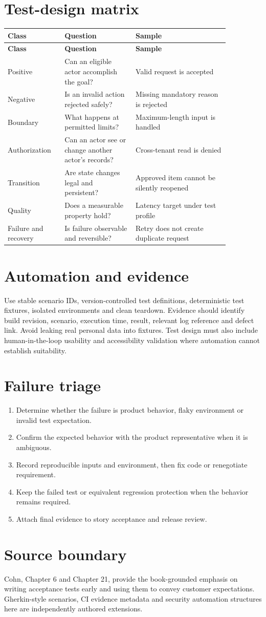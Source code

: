 \documentclass[11pt,letterpaper]{article}
\begin{document}
\section{Test-design matrix}
\begin{longtable}{|p{0.20\linewidth}|p{0.29\linewidth}|p{0.37\linewidth}|}\hline
\textbf{Class} & \textbf{Question} & \textbf{Sample} \\ \hline\endfirsthead\hline
\textbf{Class} & \textbf{Question} & \textbf{Sample} \\ \hline\endhead
Positive & Can an eligible actor accomplish the goal? & Valid request is accepted \\ \hline
Negative & Is an invalid action rejected safely? & Missing mandatory reason is rejected \\ \hline
Boundary & What happens at permitted limits? & Maximum-length input is handled \\ \hline
Authorization & Can an actor see or change another actor’s records? & Cross-tenant read is denied \\ \hline
Transition & Are state changes legal and persistent? & Approved item cannot be silently reopened \\ \hline
Quality & Does a measurable property hold? & Latency target under test profile \\ \hline
Failure and recovery & Is failure observable and reversible? & Retry does not create duplicate request \\ \hline
\end{longtable}
\section{Automation and evidence}
Use stable scenario IDs, version-controlled test definitions, deterministic test fixtures, isolated environments and clean teardown. Evidence should identify build revision, scenario, execution time, result, relevant log reference and defect link. Avoid leaking real personal data into fixtures. Test design must also include human-in-the-loop usability and accessibility validation where automation cannot establish suitability.

\section{Failure triage}
\begin{enumerate}[leftmargin=*,itemsep=3pt]
\item Determine whether the failure is product behavior, flaky environment or invalid test expectation.
\item Confirm the expected behavior with the product representative when it is ambiguous.
\item Record reproducible inputs and environment, then fix code or renegotiate requirement.
\item Keep the failed test or equivalent regression protection when the behavior remains required.
\item Attach final evidence to story acceptance and release review.
\end{enumerate}
\section{Source boundary}
Cohn, Chapter 6 and Chapter 21, provide the book-grounded emphasis on writing acceptance tests early and using them to convey customer expectations. Gherkin-style scenarios, CI evidence metadata and security automation structures here are independently authored extensions.
\end{document}
